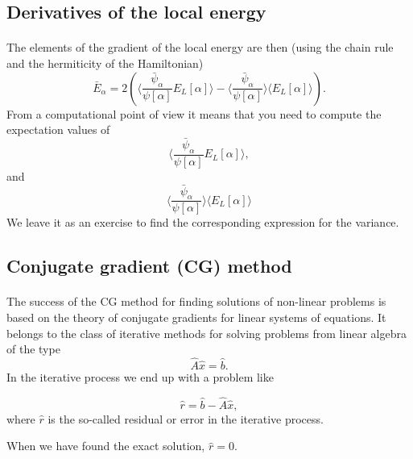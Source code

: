 \documentclass[%
twoside,                 %
final,                   %
10pt]{article}
\begin{document}
\subsection*{Derivatives of the local energy}

\paragraph{}
The elements of the gradient of the local energy are then (using the chain rule and the hermiticity of the Hamiltonian)
\[
\bar{E}_{\alpha} = 2\left( \langle \frac{\bar{\psi}_{\alpha}}{\psi[\alpha]}E_L[\alpha]\rangle -\langle \frac{\bar{\psi}_{\alpha}}{\psi[\alpha]}\rangle\langle E_L[\alpha] \rangle\right).
\]
From a computational point of view it means that you need to compute the expectation values of 
\[
\langle \frac{\bar{\psi}_{\alpha}}{\psi[\alpha]}E_L[\alpha]\rangle,
\]
and
\[
\langle \frac{\bar{\psi}_{\alpha}}{\psi[\alpha]}\rangle\langle E_L[\alpha]\rangle
\]
We leave it as an exercise to find the corresponding expression for the variance.





\subsection*{Conjugate gradient (CG) method}

\paragraph{}
The success of the CG method  for finding solutions of non-linear problems is based
on the theory of conjugate gradients for linear systems of equations. It belongs
to the class of iterative methods for solving problems from linear algebra of the type
\begin{equation*}
  \hat{A}\hat{x} = \hat{b}.
\end{equation*}
In the iterative process we end up with a problem like

\begin{equation*}
  \hat{r}= \hat{b}-\hat{A}\hat{x},
\end{equation*}
where $\hat{r}$ is the so-called residual or error in the iterative process.

When we have found the exact solution, $\hat{r}=0$.
\end{document}
